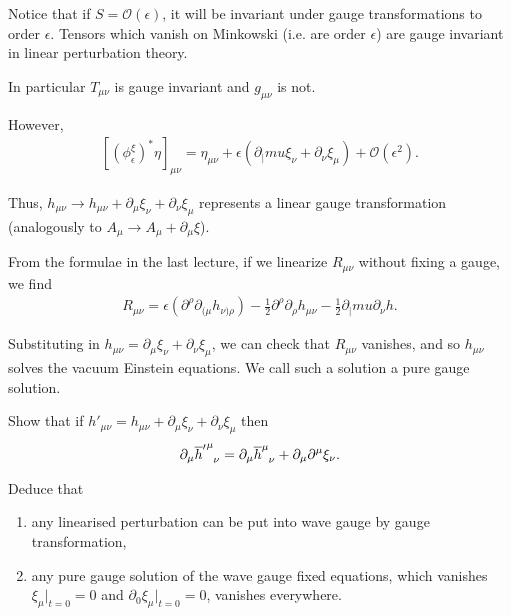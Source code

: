 
Notice that if $S = \mathcal{O}\left( \epsilon \right) $, it will be invariant under gauge transformations to order $\epsilon$. Tensors which vanish on Minkowski (i.e. are order $\epsilon$) are gauge invariant in linear perturbation theory.

In particular $T_{\mu \nu}$ is gauge invariant and $g_{\mu \nu}$ is not.

However,
\begin{align}
    \left[ \left( \phi_\epsilon^{\xi} \right)^{*} \eta \right]_{\mu \nu} = \eta_{\mu \nu} + \epsilon \left( \partial_|mu \xi_\nu + \partial_\nu \xi_\mu \right) + \mathcal{O}\left( \epsilon^2 \right) 
.\end{align}

Thus, $h_{\mu \nu} \to h_{\mu \nu} + \partial_\mu \xi_\nu + \partial_\nu \xi_\mu$ represents a linear gauge transformation (analogously to $A_\mu \to A_\mu + \partial_\mu \xi$).

From the formulae in the last lecture, if we linearize $R_{\mu \nu}$ without fixing a gauge, we find
\begin{align}
    R_{\mu \nu} = \epsilon \left( \partial^{\rho} \partial_{(\mu} h_{\nu) \rho} \right) - \frac{1}{2} \partial^{\rho} \partial_\rho h_{\mu \nu} - \frac{1}{2} \partial_|mu \partial_\nu h
.\end{align}

Substituting in $h_{\mu \nu} = \partial_\mu \xi_\nu + \partial_\nu \xi_\mu$, we can check that $R_{\mu \nu}$ vanishes, and so $h_{\mu \nu}$ solves the vacuum Einstein equations. We call such a solution a pure gauge solution.

\begin{exercise}
    Show that if $h'_{\mu \nu} = h_{\mu \nu} + \partial_\mu \xi_\nu + \partial_\nu \xi_\mu$ then
    \begin{align}
    \partial_\mu \tensor{{\overline{h}'}}{^{\mu}_\nu} = \partial_\mu \tensor{\overline{h}}{^{\mu}_{\nu}} + \partial_\mu \partial^{\mu} \xi_{\nu}
    .\end{align}

    Deduce that
    \begin{enumerate}[label=\alph*)]
        \item any linearised perturbation can be put into wave gauge by gauge transformation,
        \item any pure gauge solution of the wave gauge fixed equations, which vanishes $\xi_\mu \bigg|_{t= 0} = 0$ and $\partial_0 \xi_{\mu} \bigg|_{t = 0} = 0$, vanishes everywhere.
    \end{enumerate}
\end{exercise}

